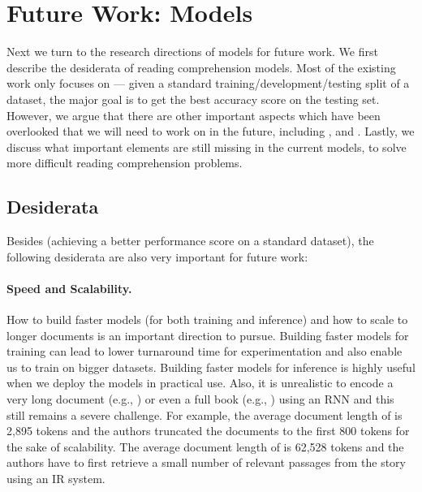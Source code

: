 
\section{Future Work: Models}
\label{sec:future-models}

Next we turn to the research directions of models for future work. We first describe the desiderata of reading comprehension models. Most of the existing work only focuses on  --- given a standard training/development/testing split of a dataset, the major goal is to get the best accuracy score on the testing set. However, we argue that there are other important aspects which have been overlooked that we will need to work on in the future, including ,  and . Lastly, we discuss what important elements are still missing in the current models, to solve more difficult reading comprehension problems.

\subsection{Desiderata}
Besides  (achieving a better performance score on a standard dataset), the following desiderata are also very important for future work:

\paragraph{Speed and Scalability.} How to build faster models (for both training and inference) and how to scale to longer documents is an important direction to pursue. Building faster models for training can lead to lower turnaround time for experimentation and also enable us to train on bigger datasets. Building faster models for inference is highly useful when we deploy the models in practical use. Also, it is unrealistic to encode a very long document (e.g., ) or even a full book (e.g., ) using an RNN and this still remains a severe challenge. For example, the average document length of  is 2,895 tokens and the authors truncated the documents to the first 800 tokens for the sake of scalability. The average document length of  is 62,528 tokens and the authors have to first retrieve a small number of relevant passages from the story using an IR system.

